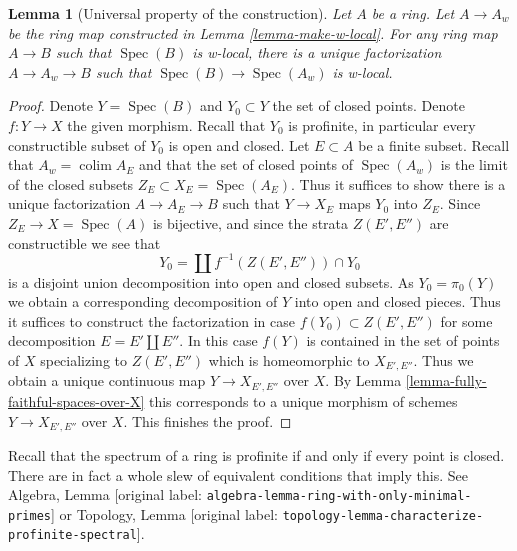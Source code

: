 \documentclass[10pt,a4paper]{article}
\theoremstyle{plain}
\newtheorem{lemma}[subsection]{Lemma}
\theoremstyle{definition}
\theoremstyle{remark}
\numberwithin{equation}{subsection}
\def\colim{\mathop{\mathrm{colim}}\nolimits}
\def\Spec{\mathop{\mathrm{Spec}}}
\begin{document}
\begin{lemma}[Universal property of the construction]
\label{lemma-universal}
Let $A$ be a ring. Let $A \to A_w$ be the ring map constructed in
Lemma \ref{lemma-make-w-local}. For any ring map $A \to B$ such that
$\Spec(B)$ is w-local, there is a unique factorization $A \to A_w \to B$
such that $\Spec(B) \to \Spec(A_w)$ is w-local.
\end{lemma}

\begin{proof}
Denote $Y = \Spec(B)$ and $Y_0 \subset Y$ the set of closed points.
Denote $f : Y \to X$ the given morphism.
Recall that $Y_0$ is profinite, in particular every constructible
subset of $Y_0$ is open and closed. Let $E \subset A$ be a finite subset.
Recall that $A_w = \colim A_E$ and that the set of closed points of
$\Spec(A_w)$ is the limit of the closed subsets $Z_E \subset X_E = \Spec(A_E)$.
Thus it suffices to show there is a unique factorization $A \to A_E \to B$
such that $Y \to X_E$ maps $Y_0$ into $Z_E$.
Since $Z_E \to X = \Spec(A)$ is bijective, and since the strata
$Z(E', E'')$ are constructible we see that
$$
Y_0 = \coprod f^{-1}(Z(E', E'')) \cap Y_0
$$
is a disjoint union decomposition into open and closed subsets.
As $Y_0 = \pi_0(Y)$ we obtain a corresponding decomposition of
$Y$ into open and closed pieces. Thus it suffices to construct
the factorization in case $f(Y_0) \subset Z(E', E'')$ for
some decomposition $E = E' \amalg E''$.
In this case $f(Y)$ is contained in the set of points of $X$
specializing to $Z(E', E'')$ which is homeomorphic to $X_{E', E''}$.
Thus we obtain a unique continuous map $Y \to X_{E', E''}$ over $X$. By
Lemma \ref{lemma-fully-faithful-spaces-over-X}
this corresponds to a unique morphism of schemes
$Y \to X_{E', E''}$ over $X$. This finishes the proof.
\end{proof}

\noindent
Recall that the spectrum of a ring is profinite if and only if
every point is closed. There are in fact a whole slew of equivalent
conditions that imply this. See
Algebra, Lemma \textnormal{[original label: \nolinkurl{algebra-lemma-ring-with-only-minimal-primes}]} or
Topology, Lemma \textnormal{[original label: \nolinkurl{topology-lemma-characterize-profinite-spectral}]}.
\end{document}
